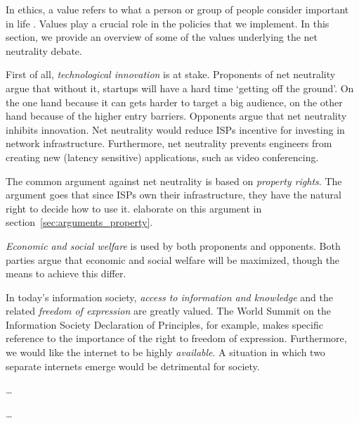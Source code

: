 
In ethics, a value refers to what a person or group of people consider important in life \cite{friedman2006value}. Values play a crucial role in the policies that we implement. In this section, we provide an overview of some of the values underlying the net neutrality debate.

First of all, \emph{technological innovation} is at stake. Proponents of net neutrality argue that without it, startups will have a hard time `getting off the ground'. On the one hand because it can gets harder to target a big audience, on the other hand because of the higher entry barriers. Opponents argue that net neutrality inhibits innovation. Net neutrality would reduce \acp{ISP} incentive for investing in network infrastructure. Furthermore, net neutrality prevents engineers from creating new (latency sensitive) applications, such as video conferencing.

The common argument against net neutrality is based on \emph{property rights}. The argument goes that since \acp{ISP} own their infrastructure, they have the natural right to decide how to use it.  elaborate on this argument in section~\ref{sec:arguments_property}.

\emph{Economic and social welfare} is used by both proponents and opponents. Both parties argue that economic and social welfare will be maximized, though the means to achieve this differ.

In today's information society, \emph{access to information and knowledge} and the related \emph{freedom of expression} are greatly valued. The World Summit on the Information Society Declaration of Principles, for example, makes specific reference to the importance of the right to freedom of expression. Furthermore, we would like the internet to be highly \emph{available}. A situation in which two separate internets emerge would be detrimental for society.

\ldots

\ldots